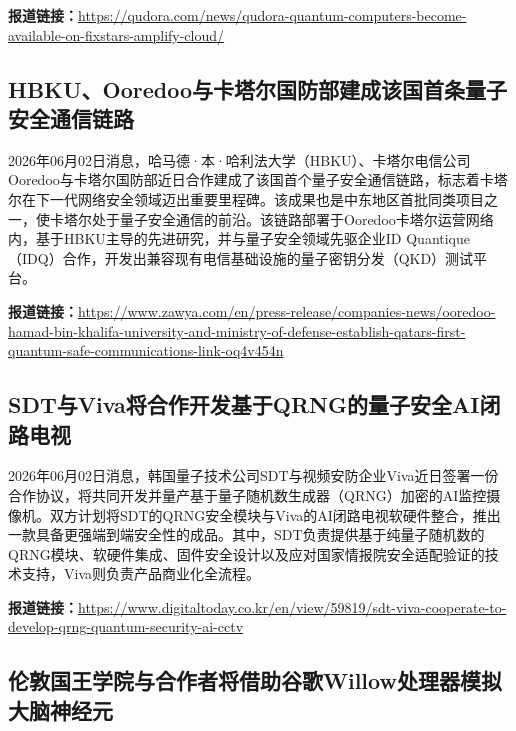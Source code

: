 \documentclass[12pt,a4paper]{ctexart}
\begin{document}
\noindent\textbf{报道链接：}\url{https://qudora.com/news/qudora-quantum-computers-become-available-on-fixstars-amplify-cloud/}

\subsection{ HBKU、Ooredoo与卡塔尔国防部建成该国首条量子安全通信链路 }

2026年06月02日消息，哈马德·本·哈利法大学（HBKU）、卡塔尔电信公司Ooredoo与卡塔尔国防部近日合作建成了该国首个量子安全通信链路，标志着卡塔尔在下一代网络安全领域迈出重要里程碑。该成果也是中东地区首批同类项目之一，使卡塔尔处于量子安全通信的前沿。该链路部署于Ooredoo卡塔尔运营网络内，基于HBKU主导的先进研究，并与量子安全领域先驱企业ID Quantique（IDQ）合作，开发出兼容现有电信基础设施的量子密钥分发（QKD）测试平台。

\noindent\textbf{报道链接：}\url{https://www.zawya.com/en/press-release/companies-news/ooredoo-hamad-bin-khalifa-university-and-ministry-of-defense-establish-qatars-first-quantum-safe-communications-link-oq4v454n}

\subsection{ SDT与Viva将合作开发基于QRNG的量子安全AI闭路电视 }

2026年06月02日消息，韩国量子技术公司SDT与视频安防企业Viva近日签署一份合作协议，将共同开发并量产基于量子随机数生成器（QRNG）加密的AI监控摄像机。双方计划将SDT的QRNG安全模块与Viva的AI闭路电视软硬件整合，推出一款具备更强端到端安全性的成品。其中，SDT负责提供基于纯量子随机数的QRNG模块、软硬件集成、固件安全设计以及应对国家情报院安全适配验证的技术支持，Viva则负责产品商业化全流程。

\noindent\textbf{报道链接：}\url{https://www.digitaltoday.co.kr/en/view/59819/sdt-viva-cooperate-to-develop-qrng-quantum-security-ai-cctv}

\subsection{ 伦敦国王学院与合作者将借助谷歌Willow处理器模拟大脑神经元 }
\end{document}
